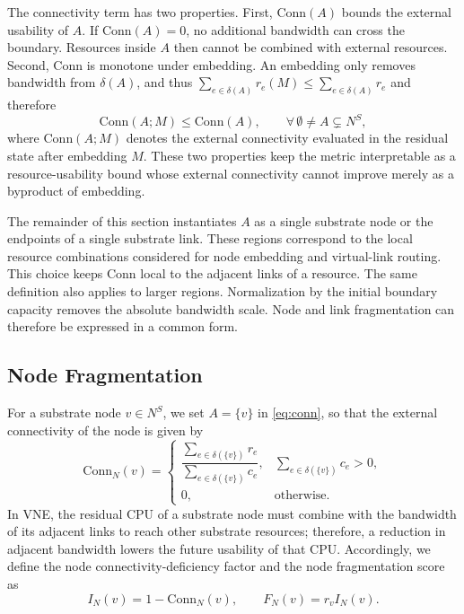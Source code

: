 \documentclass{ieeeaccess}
\begin{document}
The connectivity term has two properties. First, $\mathrm{Conn}(A)$ bounds the external usability
of $A$. If $\mathrm{Conn}(A)=0$, no additional bandwidth can cross the boundary. Resources inside
$A$ then cannot be combined with external resources. Second, $\mathrm{Conn}$ is monotone under
embedding. An embedding only removes bandwidth from $\delta(A)$, and thus
$\sum_{e\in\delta(A)}r_e(M)\le\sum_{e\in\delta(A)}r_e$ and therefore
\begin{equation}
	\mathrm{Conn}(A;M)\le\mathrm{Conn}(A),
	\qquad
	\forall\,\emptyset\neq A\subsetneq N^S,
	\label{eq:monotone}
\end{equation}
where $\mathrm{Conn}(A;M)$ denotes the external connectivity evaluated in the residual state after
embedding $M$. These two properties keep the metric
interpretable as a resource-usability bound whose external connectivity cannot improve merely as a
byproduct of embedding.

The remainder of this section instantiates $A$ as a single substrate node or the endpoints of a
single substrate link. These regions correspond to the local resource combinations considered for
node embedding and virtual-link routing. This choice keeps $\mathrm{Conn}$ local to the adjacent
links of a resource. The same definition also applies to larger regions. Normalization by the
initial boundary capacity removes the absolute bandwidth scale. Node and link fragmentation can
therefore be expressed in a common form.

\subsection{Node Fragmentation}
For a substrate node $v\in N^S$, we set $A=\{v\}$ in \eqref{eq:conn}, so that the external
connectivity of the node is given by
\begin{equation}
	\mathrm{Conn}_N(v)
	=
	\begin{cases}
		\dfrac{\sum_{e\in\delta(\{v\})}r_e}
		{\sum_{e\in\delta(\{v\})}c_e},
		  & \sum_{e\in\delta(\{v\})}c_e>0, \\[1mm]
		0,
		  & \text{otherwise.}              
	\end{cases}
	\label{eq:conn_n}
\end{equation}
In VNE, the residual CPU of a substrate node must combine with the bandwidth of its adjacent links
to reach other substrate resources; therefore, a reduction in adjacent bandwidth lowers the future
usability of that CPU. Accordingly, we define the node connectivity-deficiency factor and the node
fragmentation score as
\begin{equation}
	I_N(v)=1-\mathrm{Conn}_N(v),
	\qquad
	F_N(v)=r_v I_N(v).
	\label{eq:node_frag}
\end{equation}
\end{document}
